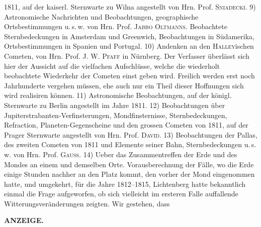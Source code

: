 1811, auf der kaiserl. Sternwarte zu Wilna angestellt von Hrn. Prof. \textsc{Sniadecki}. 9) Astronomische Nachrichten und Beobachtungen, geographische Ortsbestimmungen u.\,s.\,w. von Hrn. Prof. \textsc{Jabbo Oltmanns}. Beobachtete Sternbedeckungen in Amsterdam und Greenwich, Beobachtungen in Südamerika, Ortsbestimmungen in Spanien und Portugal. 10) Andenken an den \textsc{Halley}ischen Cometen, von Hrn. Prof. J. W. \textsc{Pfaff} in Nürnberg. Der Verfasser überlässt sich hier der Aussicht auf die vielfachen Aufschlüsse, welche die wiederholt beobachtete Wiederkehr der Cometen einst geben wird. Freilich werden erst noch Jahrhunderte vergehen müssen, ehe auch nur ein Theil dieser Hoffnungen sich wird realisiren können. 11) Astronomische Beobachtungen, auf der königl. Sternwarte zu Berlin angestellt im Jahre 1811. 12) Beobachtungen über Jupiterstrabanten-Verfinsterungen, Mondfinsternisse, Sternbedeckungen, Refraction, Planeten-Gegenscheine und den grossen Cometen von 1811, auf der Prager Sternwarte angestellt von Hrn. Prof. \textsc{David}. 13) Beobachtungen der Pallas, des zweiten Cometen von 1811 und Elemente seiner Bahn, Sternbedeckungen u.\,s.\,w. von Hrn. Prof. \textsc{Gauss}. 14) Ueber das Zusammentreffen der Erde und des Mondes an einem und demselben Orte. Vorausberechnung der Fälle, wo die Erde einige Stunden nachher an den Platz kommt, den vorher der Mond eingenommen hatte, und umgekehrt, für die Jahre 1812--1815, Lichtenberg hatte bekanntlich einmal die Frage aufgeworfen, ob sich vielleicht im ersteren Falle auffallende Witterungsveränderungen zeigten. Wir gestehen, dass\par
\clearpage
\thispagestyle{empty}
\noindent{}%
%
\parbox[t]{\dimexpr\linewidth-24mm\relax}{\centering\footnotesize\bfseries ANZEIGE.\par}%
\makebox[12mm][r]{}\par\medskip
